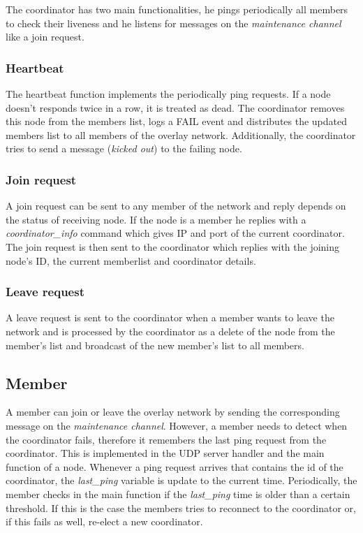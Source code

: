 \documentclass[paper=a4, fontsize=11pt]{scrartcl} %
\numberwithin{equation}{section} %
\numberwithin{figure}{section} %
\numberwithin{table}{section} %
\begin{document}
The coordinator has two main functionalities, he pings periodically all members to check their liveness and he listens for messages on the \textit{maintenance channel} like a join request. 

\subsubsection{Heartbeat}
The heartbeat function implements the periodically ping requests.
If a node doesn't responds twice in a row, it is treated as dead. The coordinator removes this node from the members list, logs a FAIL event and distributes the updated members list to all members of the overlay network. Additionally, the coordinator tries to send a message (\textit{kicked out}) to the failing node.

\subsubsection{Join request}
A join request can be sent to any member of the network and reply depends on the status of receiving node. If the node is a member he replies with a \textit{coordinator\_info} command which gives IP and port of the current coordinator. The join request is then sent to the coordinator which replies with the joining node's ID, the current memberlist and coordinator details.

\subsubsection{Leave request}
A leave request is sent to the coordinator when a member wants to leave the network and is processed by the coordinator as a delete of the node from the member's list and broadcast of the new member's list to all members.



\subsection{Member}

A member can join or leave the overlay network by sending the corresponding message on the \textit{maintenance channel}. However, a member needs to detect when the coordinator fails, therefore it remembers the last ping request from the coordinator. This is implemented in the UDP server handler and the main function of a node. Whenever a ping request arrives that contains the id of the coordinator, the \textit{last\_ping} variable is update to the current time. Periodically, the member checks in the main function if the \textit{last\_ping} time is older than a certain threshold. If this is the case the members tries to reconnect to the coordinator or, if this fails as well, re-elect a new coordinator. 
\end{document}
